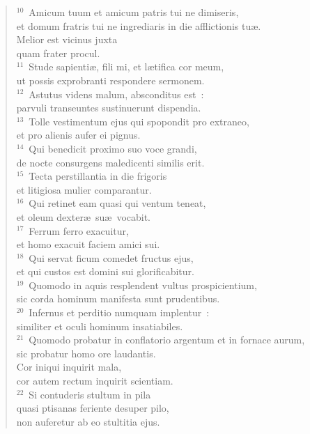 \begin{flushleft}\begin{verse}${}^{10}$~Amicum tuum et amicum patris tui ne dimiseris,\\ et domum fratris tui ne ingrediaris in die afflictionis tu\ae .\\ Melior est vicinus juxta\\ quam frater procul.\\
${}^{11}$~Stude sapienti\ae , fili mi, et l\ae tifica cor meum,\\ ut possis exprobranti respondere sermonem.\\
${}^{12}$~Astutus videns malum, absconditus est~:\\ parvuli transeuntes sustinuerunt dispendia.\\
${}^{13}$~Tolle vestimentum ejus qui spopondit pro extraneo,\\ et pro alienis aufer ei pignus.\\
${}^{14}$~Qui benedicit proximo suo voce grandi,\\ de nocte consurgens maledicenti similis erit.\\
${}^{15}$~Tecta perstillantia in die frigoris\\ et litigiosa mulier comparantur.\\
${}^{16}$~Qui retinet eam quasi qui ventum teneat,\\ et oleum dexter\ae\ su\ae\ vocabit.\\
${}^{17}$~Ferrum ferro exacuitur,\\ et homo exacuit faciem amici sui.\\
${}^{18}$~Qui servat ficum comedet fructus ejus,\\ et qui custos est domini sui glorificabitur.\\
${}^{19}$~Quomodo in aquis resplendent vultus prospicientium,\\ sic corda hominum manifesta sunt prudentibus.\\
${}^{20}$~Infernus et perditio numquam implentur~:\\ similiter et oculi hominum insatiabiles.\\
${}^{21}$~Quomodo probatur in conflatorio argentum et in fornace aurum,\\ sic probatur homo ore laudantis.\\ Cor iniqui inquirit mala,\\ cor autem rectum inquirit scientiam.\\
${}^{22}$~Si contuderis stultum in pila\\ quasi ptisanas feriente desuper pilo,\\ non auferetur ab eo stultitia ejus.\end{verse}\end{flushleft}


